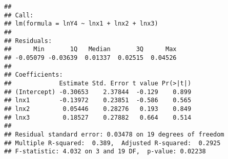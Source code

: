 \documentclass[
]{article}
\newenvironment{Shaded}{\begin{snugshade}}{\end{snugshade}}
\newcommand{\DecValTok}[1]{\textcolor[rgb]{0.00,0.00,0.81}{#1}}
\newcommand{\FloatTok}[1]{\textcolor[rgb]{0.00,0.00,0.81}{#1}}
\newcommand{\KeywordTok}[1]{\textcolor[rgb]{0.13,0.29,0.53}{\textbf{#1}}}
\newcommand{\NormalTok}[1]{#1}
\newcommand{\OperatorTok}[1]{\textcolor[rgb]{0.81,0.36,0.00}{\textbf{#1}}}
\newcommand{\StringTok}[1]{\textcolor[rgb]{0.31,0.60,0.02}{#1}}
\begin{document}
\begin{verbatim}
## 
## Call:
## lm(formula = lnY4 ~ lnx1 + lnx2 + lnx3)
## 
## Residuals:
##      Min       1Q   Median       3Q      Max 
## -0.05079 -0.03639  0.01337  0.02515  0.04526 
## 
## Coefficients:
##             Estimate Std. Error t value Pr(>|t|)
## (Intercept) -0.30653    2.37844  -0.129    0.899
## lnx1        -0.13972    0.23851  -0.586    0.565
## lnx2         0.05446    0.28276   0.193    0.849
## lnx3         0.18527    0.27882   0.664    0.514
## 
## Residual standard error: 0.03478 on 19 degrees of freedom
## Multiple R-squared:  0.389,  Adjusted R-squared:  0.2925 
## F-statistic: 4.032 on 3 and 19 DF,  p-value: 0.02238
\end{verbatim}

\begin{Shaded}
\end{Shaded}
\end{document}
